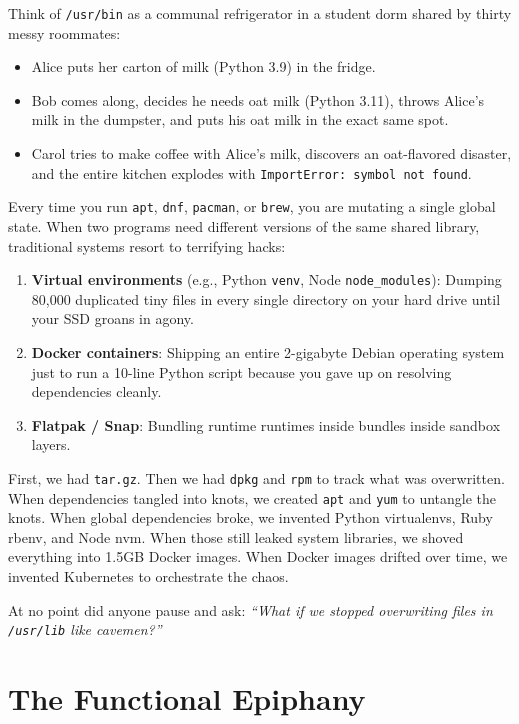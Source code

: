 Think of \texttt{/usr/bin} as a communal refrigerator in a student dorm shared by thirty messy roommates:
\begin{itemize}
  \item Alice puts her carton of milk (Python 3.9) in the fridge.
  \item Bob comes along, decides he needs oat milk (Python 3.11), throws Alice's milk in the dumpster, and puts his oat milk in the exact same spot.
  \item Carol tries to make coffee with Alice's milk, discovers an oat-flavored disaster, and the entire kitchen explodes with \texttt{ImportError: symbol not found}.
\end{itemize}

Every time you run \texttt{apt}, \texttt{dnf}, \texttt{pacman}, or \texttt{brew}, you are mutating a single global state. When two programs need different versions of the same shared library, traditional systems resort to terrifying hacks:
\begin{enumerate}
  \item \textbf{Virtual environments} (e.g., Python \texttt{venv}, Node \texttt{node\_modules}): Dumping 80,000 duplicated tiny files in every single directory on your hard drive until your SSD groans in agony.
  \item \textbf{Docker containers}: Shipping an entire 2-gigabyte Debian operating system just to run a 10-line Python script because you gave up on resolving dependencies cleanly.
  \item \textbf{Flatpak / Snap}: Bundling runtime runtimes inside bundles inside sandbox layers.
\end{enumerate}

\begin{tearsbox}
First, we had \texttt{tar.gz}. Then we had \texttt{dpkg} and \texttt{rpm} to track what was overwritten. When dependencies tangled into knots, we created \texttt{apt} and \texttt{yum} to untangle the knots. When global dependencies broke, we invented Python virtualenvs, Ruby rbenv, and Node nvm. When those still leaked system libraries, we shoved everything into 1.5GB Docker images. When Docker images drifted over time, we invented Kubernetes to orchestrate the chaos.

At no point did anyone pause and ask: \emph{``What if we stopped overwriting files in \texttt{/usr/lib} like cavemen?''}
\end{tearsbox}

\section*{The Functional Epiphany}

